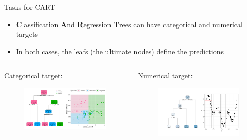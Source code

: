 \documentclass[11pt,compress,t,notes=noshow, xcolor=table]{beamer}
\begin{document}
\begin{vbframe}{Tasks for CART}
  \begin{itemize}

    \item \textbf{C}lassification \textbf{A}nd \textbf{R}egression \textbf{T}rees can have categorical and numerical targets
    \item In both cases, the leafs (the ultimate nodes) define the predictions
  \end{itemize}
  
  \begin{columns}
\begin{column}{0.5\textwidth}
  Categorical target:
    \begin{figure}
    \centering
\includegraphics[width=0.99\textwidth, keepaspectratio]{figure/tree-classif-depth3.pdf}
    \end{figure}
\end{column}
\begin{column}{0.5\textwidth}

  Numerical target:

    \begin{figure}
    \centering
\includegraphics[width=0.99\textwidth, keepaspectratio]{figure/tree-regr-depth3.pdf}
    \end{figure}
\end{column}
\end{columns}
  
\end{vbframe}
\end{document}

